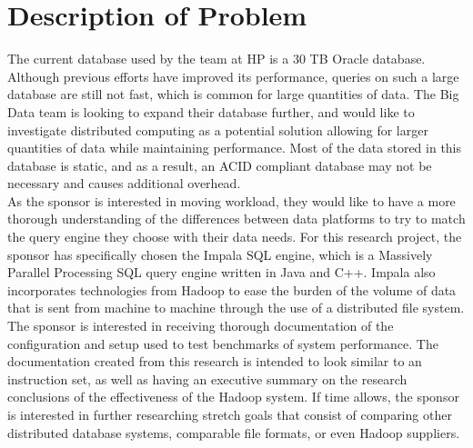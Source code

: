 \documentclass[onecolumn, draftclsnofoot,10pt, compsoc]{IEEEtran}
\begin{document}
\begin{titlepage}
\begin{singlespace}
\begin{abstract}
        \end{abstract}     
    \end{singlespace}
\end{titlepage}
\newpage
{}
\tableofcontents
\clearpage

\section{Description of Problem}
\indent The current database used by the team at HP is a 30 TB Oracle database. Although previous efforts have improved its performance, queries on such a large database are still not fast, which is common for large quantities of data. The Big Data team is looking to expand their database further, and would like to investigate distributed computing as a potential solution allowing for larger quantities of data while maintaining performance. Most of the data stored in this database is static, and as a result, an ACID compliant database may not be necessary and causes additional overhead.\\
\indent As the sponsor is interested in moving workload, they would like to have a more thorough understanding of the differences between data platforms to try to match the query engine they choose with their data needs. For this research project, the sponsor has specifically chosen the Impala SQL engine, which is a Massively Parallel Processing SQL query engine written in Java and C++. Impala also incorporates technologies from Hadoop to ease the burden of the volume of data that is sent from machine to machine through the use of a distributed file system. \\
\indent The sponsor is interested in receiving thorough documentation of the configuration and setup used to test benchmarks of system performance. The documentation created from this research is intended to look similar to an instruction set, as well as having an executive summary on the research conclusions of the effectiveness of the Hadoop system. If time allows, the sponsor is interested in further researching stretch goals that consist of comparing other distributed database systems, comparable file formats, or even Hadoop suppliers.
\end{document}
